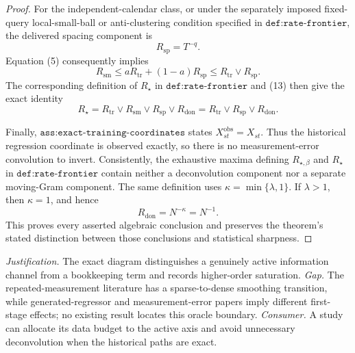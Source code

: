 \documentclass{article}
\begin{document}
\begin{proof}
For the independent-calendar class, or under the separately imposed fixed-query local-small-ball or anti-clustering condition specified in \(\texttt{def:rate-frontier}\), the delivered spacing component is
\[
R_{\mathrm{sp}}=T^{-q}.
\]
Equation (5) consequently implies
\[
R_{\mathrm{sm}}
\leq aR_{\mathrm{tr}}+(1-a)R_{\mathrm{sp}}
\leq R_{\mathrm{tr}}\vee R_{\mathrm{sp}}.
\tag{13}
\]
The corresponding definition of \(R_\star\) in \(\texttt{def:rate-frontier}\) and (13) then give the exact identity
\[
R_\star
=R_{\mathrm{tr}}\vee R_{\mathrm{sm}}\vee R_{\mathrm{sp}}\vee R_{\mathrm{don}}
=R_{\mathrm{tr}}\vee R_{\mathrm{sp}}\vee R_{\mathrm{don}}.
\]

Finally, \(\texttt{ass:exact-training-coordinates}\) states \(X_{st}^{\mathrm{obs}}=X_{st}\).  Thus the historical regression coordinate is observed exactly, so there is no measurement-error convolution to invert.  Consistently, the exhaustive maxima defining \(R_{\star,\beta}\) and \(R_\star\) in \(\texttt{def:rate-frontier}\) contain neither a deconvolution component nor a separate moving-Gram component.  The same definition uses \(\kappa=\min\{\lambda,1\}\).  If \(\lambda>1\), then \(\kappa=1\), and hence
\[
R_{\mathrm{don}}=N^{-\kappa}=N^{-1}.
\]
This proves every asserted algebraic conclusion and preserves the theorem's stated distinction between those conclusions and statistical sharpness.
\end{proof}
\par\smallskip\noindent \textit{Justification.} The exact diagram distinguishes a genuinely active information channel from a bookkeeping term and records higher-order saturation. \textit{Gap.} The repeated-measurement literature has a sparse-to-dense smoothing transition, while generated-regressor and measurement-error papers imply different first-stage effects; no existing result locates this oracle boundary. \textit{Consumer.} A study can allocate its data budget to the active axis and avoid unnecessary deconvolution when the historical paths are exact.
\end{document}

